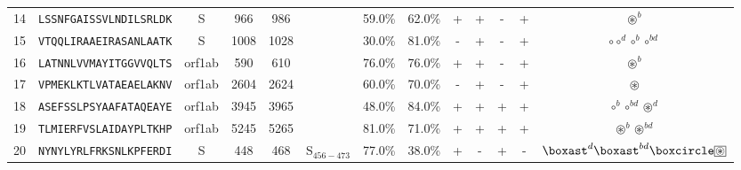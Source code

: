 \begin{tabular}{rcccccccccccc}
14 &  \texttt{LSSNFGAISSVLNDILSRLDK} &       S &    966 &   986 &                &                          59.0\% &                           62.0\% &          + &           + &          - &           + &                                                                                                             $ \circledast^b $ \\
15 &  \texttt{VTQQLIRAAEIRASANLAATK} &       S &   1008 &  1028 &                &                          30.0\% &                           81.0\% &          - &           + &          - &           + &                                                                                          $ \circ \circ^d \circ^b \circ^{bd} $ \\
16 &  \texttt{LATNNLVVMAYITGGVVQLTS} &  orf1ab &    590 &   610 &                &                          76.0\% &                           76.0\% &          + &           + &          - &           + &                                                                                                             $ \circledast^b $ \\
17 &  \texttt{VPMEKLKTLVATAEAELAKNV} &  orf1ab &   2604 &  2624 &                &                          60.0\% &                           70.0\% &          - &           + &          - &           + &                                                                                                               $ \circledast $ \\
18 &  \texttt{ASEFSSLPSYAAFATAQEAYE} &  orf1ab &   3945 &  3965 &                &                          48.0\% &                           84.0\% &          + &           + &          + &           + &                                                                                          $ \circ^b \circ^{bd} \circledast^d $ \\
19 &  \texttt{TLMIERFVSLAIDAYPLTKHP} &  orf1ab &   5245 &  5265 &                &                          81.0\% &                           71.0\% &          + &           + &          + &           + &                                                                                            $ \circledast^b \circledast^{bd} $ \\
20 &  \texttt{NYNYLYRLFRKSNLKPFERDI} &       S &    448 &   468 &  S$_{456-473}$ &                          77.0\% &                           38.0\% &          + &           - &          + &           - &                                         $ \boxast^d \boxast^{bd} \boxcircle \setlength{\fboxsep}{0.5pt} \boxed{\circledast} $ \\

\end{tabular}
